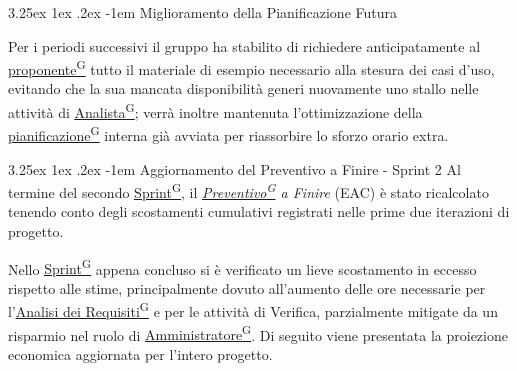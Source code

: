 \documentclass[a4paper,12pt]{article}
\makeatletter
\renewcommand\paragraph{\@startsection{paragraph}{5}{\z@}%
  {3.25ex \@plus1ex \@minus.2ex}%
  {-1em}%
  {\normalfont\normalsize\bfseries}}
\providecommand{\glslink}[2]{\href{https://alittlebyte-19.github.io/Documentazione/glossario.html\#gls-#1}{\underline{#2}\textsuperscript{\scriptsize G}}}
\makeatother
\begin{document}
\paragraph{Miglioramento della Pianificazione Futura}

Per i periodi successivi il gruppo ha stabilito di richiedere anticipatamente al \glslink{committente-proponente}{proponente} tutto il materiale di esempio necessario alla stesura dei casi d'uso, evitando che la sua mancata disponibilità generi nuovamente uno stallo nelle attività di \glslink{analista}{Analista}; verrà inoltre mantenuta l'ottimizzazione della \glslink{pianificazione}{pianificazione} interna già avviata per riassorbire lo sforzo orario extra.


\paragraph{Aggiornamento del Preventivo a Finire - Sprint 2}
Al termine del secondo \glslink{sprint}{Sprint}, il \textit{\glslink{preventivo}{Preventivo} a Finire} (EAC) è stato ricalcolato tenendo conto degli scostamenti cumulativi registrati nelle prime due iterazioni di progetto. 

Nello \glslink{sprint}{Sprint} appena concluso si è verificato un lieve scostamento in eccesso rispetto alle stime, principalmente dovuto all'aumento delle ore necessarie per l'\glslink{analisi-dei-requisiti-adr}{Analisi dei Requisiti} e per le attività di Verifica, parzialmente mitigate da un risparmio nel ruolo di \glslink{amministratore}{Amministratore}. Di seguito viene presentata la proiezione economica aggiornata per l'intero progetto.
\end{document}
